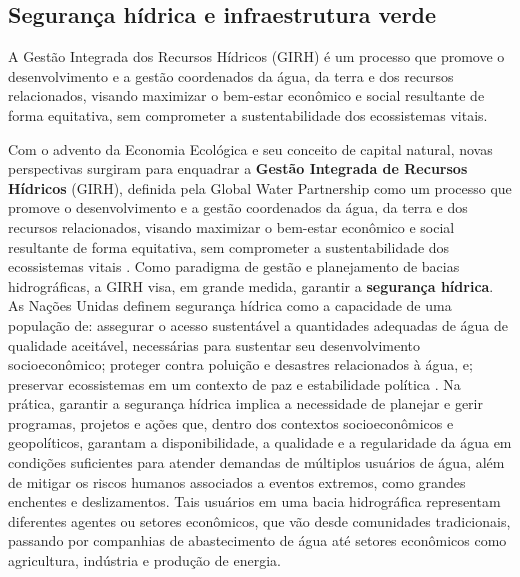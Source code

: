\documentclass[./main.tex]{subfiles}
\begin{document}
\subsection{Segurança hídrica e infraestrutura verde} \label{sec:watersheds:watersecurity}

A Gestão Integrada dos Recursos Hídricos (GIRH) é um processo que promove o desenvolvimento e a gestão coordenados da água, da terra e dos recursos relacionados, visando maximizar o bem-estar econômico e social resultante de forma equitativa, sem comprometer a sustentabilidade dos ecossistemas vitais.

\par Com o advento da Economia Ecológica e seu conceito de capital natural, novas perspectivas surgiram para enquadrar a \textbf{Gestão Integrada de Recursos Hídricos} (GIRH), definida pela Global Water Partnership como um processo que promove o desenvolvimento e a gestão coordenados da água, da terra e dos recursos relacionados, visando maximizar o bem-estar econômico e social resultante de forma equitativa, sem comprometer a sustentabilidade dos ecossistemas vitais \cite{GWP2000}. Como paradigma de gestão e planejamento de bacias hidrográficas, a GIRH visa, em grande medida, garantir a \textbf{segurança hídrica}. As Nações Unidas definem segurança hídrica como a capacidade de uma população de: assegurar o acesso sustentável a quantidades adequadas de água de qualidade aceitável, necessárias para sustentar seu desenvolvimento socioeconômico; proteger contra poluição e desastres relacionados à água, e; preservar ecossistemas em um contexto de paz e estabilidade política \cite{cassin2021}. Na prática, garantir a segurança hídrica implica a necessidade de planejar e gerir programas, projetos e ações que, dentro dos contextos socioeconômicos e geopolíticos, garantam a disponibilidade, a qualidade e a regularidade da água em condições suficientes para atender demandas de múltiplos usuários de água, além de mitigar os riscos humanos associados a eventos extremos, como grandes enchentes e deslizamentos. Tais usuários em uma bacia hidrográfica representam diferentes agentes ou setores econômicos, que vão desde comunidades tradicionais, passando por companhias de abastecimento de água até setores econômicos como agricultura, indústria e produção de energia. 
\end{document}
